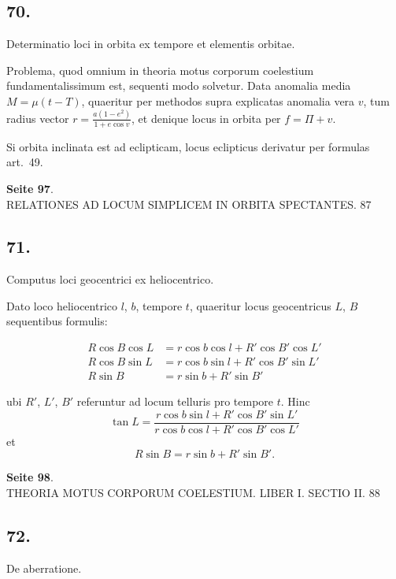 \documentclass[12pt,a4paper]{article}
\begin{document}
\subsection*{70.}

Determinatio loci in orbita ex tempore et elementis orbitae.

Problema, quod omnium in theoria motus corporum coelestium fundamentalissimum est, sequenti modo solvetur. Data anomalia media $M = \mu(t - T)$, quaeritur per methodos supra explicatas anomalia vera $v$, tum radius vector $r = \frac{a(1-e^2)}{1 + e \cos v}$, et denique locus in orbita per $f = \Pi + v$.

Si orbita inclinata est ad eclipticam, locus eclipticus derivatur per formulas art.~49.

\textbf{Seite 97}.\\
RELATIONES AD LOCUM SIMPLICEM IN ORBITA SPECTANTES. 87

\subsection*{71.}

Computus loci geocentrici ex heliocentrico.

Dato loco heliocentrico $l$, $b$, tempore $t$, quaeritur locus geocentricus $L$, $B$ sequentibus formulis:

\begin{align}
R \cos B \cos L &= r \cos b \cos l + R' \cos B' \cos L' \\
R \cos B \sin L &= r \cos b \sin l + R' \cos B' \sin L' \\
R \sin B &= r \sin b + R' \sin B'
\end{align}

ubi $R'$, $L'$, $B'$ referuntur ad locum telluris pro tempore $t$. Hinc
\[
\tan L = \frac{r \cos b \sin l + R' \cos B' \sin L'}{r \cos b \cos l + R' \cos B' \cos L'}
\]
et
\[
R \sin B = r \sin b + R' \sin B'.
\]

\textbf{Seite 98}.\\
THEORIA MOTUS CORPORUM COELESTIUM. LIBER I. SECTIO II. 88

\subsection*{72.}

De aberratione.
\end{document}
